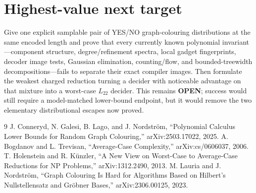 \documentclass[11pt]{article}
\newcommand{\Ltwo}{L_{22}}
\newcommand{\OPEN}{\textbf{OPEN}}
\begin{document}
\section{Highest-value next target}
Give one explicit samplable pair of YES/NO graph-colouring distributions at
the same encoded length and prove that every currently known polynomial
invariant---component structure, degree/refinement spectra, local gadget
fingerprints, decoder image tests, Gaussian elimination, counting/flow, and
bounded-treewidth decompositions---fails to separate their exact compiler
images.  Then formulate the weakest charged reduction turning a decider with
noticeable advantage on that mixture into a worst-case $\Ltwo$ decider.
This remains \OPEN{}; success would still require a model-matched lower-bound
endpoint, but it would remove the two elementary distributional escapes now
proved.

\begin{thebibliography}{9}
J. Conneryd, N. Galesi, B. Lago, and J. Nordstr\"om,
``Polynomial Calculus Lower Bounds for Random Graph Colouring,''
arXiv:2503.17022, 2025.
A. Bogdanov and L. Trevisan,
``Average-Case Complexity,'' arXiv:cs/0606037, 2006.
T. Holenstein and R. K\"unzler,
``A New View on Worst-Case to Average-Case Reductions for NP Problems,''
arXiv:1312.2490, 2013.
M. Lauria and J. Nordstr\"om,
``Graph Colouring Is Hard for Algorithms Based on Hilbert's Nullstellensatz
and Gr\"obner Bases,'' arXiv:2306.00125, 2023.
\end{thebibliography}

\end{document}
